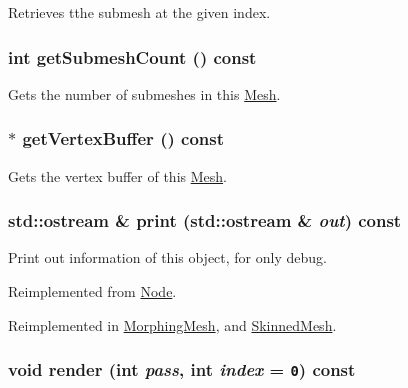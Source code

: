 Retrieves tthe submesh at the given index. \hypertarget{classm3g_1_1Mesh_5dc5a57ad549eb97504c2a1280a882dd}{
\subsubsection[{getSubmeshCount}]{\setlength{\rightskip}{0pt plus 5cm}int getSubmeshCount () const}}
\label{classm3g_1_1Mesh_5dc5a57ad549eb97504c2a1280a882dd}


Gets the number of submeshes in this \hyperlink{classm3g_1_1Mesh}{Mesh}. \hypertarget{classm3g_1_1Mesh_7602e9bf450fa8b3ec3c60e2e88cba25}{
\subsubsection[{getVertexBuffer}]{ $\ast$ getVertexBuffer () const}}
\label{classm3g_1_1Mesh_7602e9bf450fa8b3ec3c60e2e88cba25}


Gets the vertex buffer of this \hyperlink{classm3g_1_1Mesh}{Mesh}. \hypertarget{classm3g_1_1Mesh_6fea17fa1532df3794f8cb39cb4f911f}{
\subsubsection[{print}]{\setlength{\rightskip}{0pt plus 5cm}std::ostream \& print (std::ostream \& {\em out}) const}}
\label{classm3g_1_1Mesh_6fea17fa1532df3794f8cb39cb4f911f}


Print out information of this object, for only debug. 

Reimplemented from \hyperlink{classm3g_1_1Node_6fea17fa1532df3794f8cb39cb4f911f}{Node}.

Reimplemented in \hyperlink{classm3g_1_1MorphingMesh_6fea17fa1532df3794f8cb39cb4f911f}{MorphingMesh}, and \hyperlink{classm3g_1_1SkinnedMesh_6fea17fa1532df3794f8cb39cb4f911f}{SkinnedMesh}.\hypertarget{classm3g_1_1Mesh_1efcb1973989d9963d5bd6d03065d389}{
\subsubsection[{render}]{\setlength{\rightskip}{0pt plus 5cm}void render (int {\em pass}, \/  int {\em index} = {\tt 0}) const}}
\label{classm3g_1_1Mesh_1efcb1973989d9963d5bd6d03065d389}


